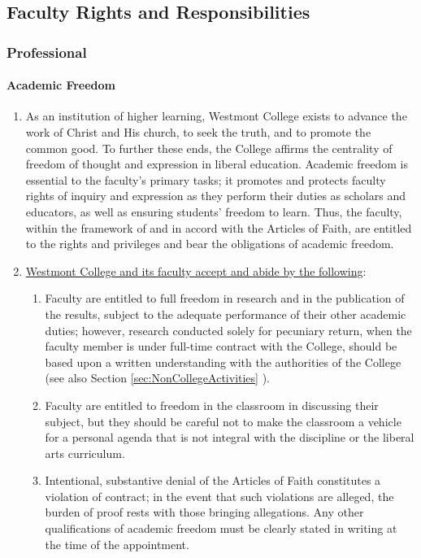 	\subsection{Faculty Rights and Responsibilities}
		\subsubsection{Professional}
			\paragraph{Academic Freedom}
				\label{sec:AcademicFreedom}
				\begin{enumerate}[label=\alph*)]
					\item{As an institution of higher learning, Westmont College exists to advance the work of Christ and His church, to seek the truth, and to promote the common good.  To further these ends, the College affirms the centrality of freedom of thought and expression in liberal education.  Academic freedom is essential to the faculty's primary tasks; it promotes and protects faculty rights of inquiry and expression as they perform their duties as scholars and educators, as well as ensuring students' freedom to learn.  Thus, the faculty, within the framework of and in accord with the Articles of Faith, are entitled to the rights and privileges and bear the obligations of academic freedom.}
					\item{\underline{Westmont College and its faculty accept and
							abide by the following}:
						\begin{enumerate}[label=\arabic*)]
							\item{Faculty are entitled to full freedom in research and in the publication of the results, subject to the adequate performance of their other academic duties; however, research conducted solely for pecuniary return, when the faculty member is under full-time contract with the College, should be based upon a written understanding with the authorities of the College (see also
								Section
								\ref{sec:NonCollegeActivities}
								).}
							\item{Faculty are entitled to freedom in the classroom in discussing their subject, but they should be careful not to make the classroom a vehicle for a personal agenda that is not integral with the discipline or the liberal arts curriculum.}
							\item{Intentional, substantive denial of the Articles of Faith constitutes a violation of contract; in the event that such violations are alleged, the burden of proof rests with those bringing allegations.  Any other qualifications of academic freedom must be clearly stated in writing at the time of the appointment.}

\end{enumerate}}
\end{enumerate}

